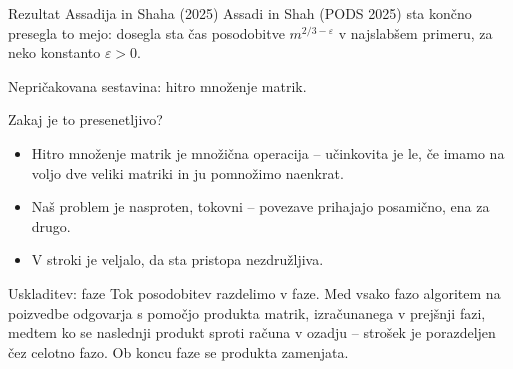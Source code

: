 \documentclass[aspectratio=169,10pt]{beamer}
\begin{document}
\begin{frame}{Rezultat Assadija in Shaha (2025)}
  Assadi in Shah (PODS 2025) sta končno presegla to mejo: dosegla sta čas posodobitve $m^{2/3-\varepsilon}$ v najslabšem primeru, za neko konstanto $\varepsilon > 0$.

  \vspace{0.4em}
  Nepričakovana sestavina: \alert{hitro množenje matrik}.

  \vspace{0.6em}
  Zakaj je to presenetljivo?
  \begin{itemize}
    \item Hitro množenje matrik je \alert{množična} operacija -- učinkovita je le, če imamo na voljo dve veliki matriki in ju pomnožimo naenkrat.
    \item Naš problem je nasproten, \alert{tokovni} -- povezave prihajajo posamično, ena za drugo.
    \item V stroki je veljalo, da sta pristopa nezdružljiva.
  \end{itemize}

  \vspace{0.4em}
  \begin{block}{Uskladitev: faze}
    Tok posodobitev razdelimo v faze. Med vsako fazo algoritem na poizvedbe odgovarja s pomočjo produkta matrik, izračunanega v prejšnji fazi, medtem ko se naslednji produkt sproti računa v ozadju -- strošek je porazdeljen čez celotno fazo. Ob koncu faze se produkta zamenjata.
  \end{block}
\end{frame}

\end{document}
